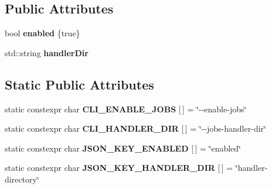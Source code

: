 \subsection*{Public Attributes}
\begin{DoxyCompactItemize}
\item 
\mbox{\label{struct_aws_1_1_iot_1_1_device_client_1_1_plain_config_1_1_jobs_a6b3f4a5e7c6959f734cd22c6e0fee48d}} 
bool {\bfseries enabled} \{true\}
\item 
\mbox{\label{struct_aws_1_1_iot_1_1_device_client_1_1_plain_config_1_1_jobs_a18a901f3ef6a45e5763158abe633fb24}} 
std\+::string {\bfseries handler\+Dir}
\end{DoxyCompactItemize}
\subsection*{Static Public Attributes}
\begin{DoxyCompactItemize}
\item 
\mbox{\label{struct_aws_1_1_iot_1_1_device_client_1_1_plain_config_1_1_jobs_a587de02d23036378f93573f484cffb6a}} 
static constexpr char {\bfseries C\+L\+I\+\_\+\+E\+N\+A\+B\+L\+E\+\_\+\+J\+O\+BS} \mbox{[}$\,$\mbox{]} = \char`\"{}-\/-\/enable-\/jobs\char`\"{}
\item 
\mbox{\label{struct_aws_1_1_iot_1_1_device_client_1_1_plain_config_1_1_jobs_a041fa0eff8dc923927935903a0253312}} 
static constexpr char {\bfseries C\+L\+I\+\_\+\+H\+A\+N\+D\+L\+E\+R\+\_\+\+D\+IR} \mbox{[}$\,$\mbox{]} = \char`\"{}-\/-\/jobs-\/handler-\/dir\char`\"{}
\item 
\mbox{\label{struct_aws_1_1_iot_1_1_device_client_1_1_plain_config_1_1_jobs_a21b9a9dd9b657cb345dad8d172734dcd}} 
static constexpr char {\bfseries J\+S\+O\+N\+\_\+\+K\+E\+Y\+\_\+\+E\+N\+A\+B\+L\+ED} \mbox{[}$\,$\mbox{]} = \char`\"{}enabled\char`\"{}
\item 
\mbox{\label{struct_aws_1_1_iot_1_1_device_client_1_1_plain_config_1_1_jobs_a4e489998542e51a6b27b31216c37776d}} 
static constexpr char {\bfseries J\+S\+O\+N\+\_\+\+K\+E\+Y\+\_\+\+H\+A\+N\+D\+L\+E\+R\+\_\+\+D\+IR} \mbox{[}$\,$\mbox{]} = \char`\"{}handler-\/directory\char`\"{}
\end{DoxyCompactItemize}


